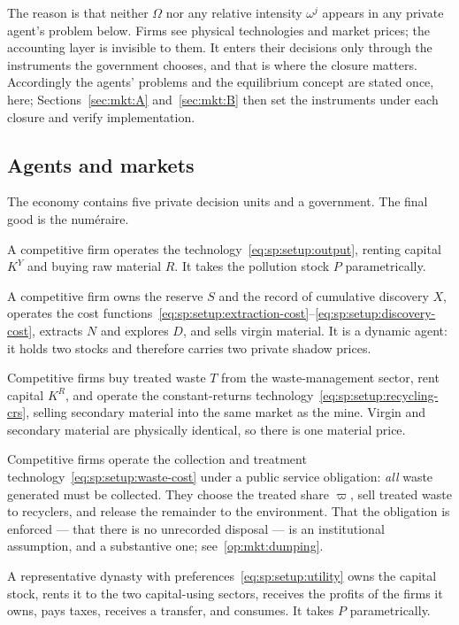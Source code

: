 The reason is that neither $\Omega$ nor any relative intensity $\omega^j$ appears in any private
agent's problem below. Firms see physical technologies and market prices; the accounting layer is
invisible to them. It enters their decisions only through the instruments the government chooses, and
that is where the closure matters. Accordingly the agents' problems and the equilibrium concept are
stated once, here; Sections~\ref{sec:mkt:A} and~\ref{sec:mkt:B} then set the instruments under each
closure and verify implementation.


\subsection{Agents and markets}\label{sec:mkt:setup:agents}

The economy contains five private decision units and a government. The final good is the numéraire.

 A competitive firm operates the technology~\eqref{eq:sp:setup:output},
renting capital $K^Y$ and buying raw material $R$. It takes the pollution stock $P$ parametrically.

 A competitive firm owns the reserve $S$ and the record of cumulative discovery
$X$, operates the cost functions~\eqref{eq:sp:setup:extraction-cost}--\eqref{eq:sp:setup:discovery-cost},
extracts $N$ and explores $D$, and sells virgin material. It is a dynamic agent: it holds two stocks
and therefore carries two private shadow prices.

 Competitive firms buy treated waste $T$ from the waste-management
sector, rent capital $K^R$, and operate the constant-returns
technology~\eqref{eq:sp:setup:recycling-crs}, selling secondary material into the same market as the
mine. Virgin and secondary material are physically identical, so there is one material price.

 Competitive firms operate the collection and treatment
technology~\eqref{eq:sp:setup:waste-cost} under a public service obligation: \emph{all} waste generated
must be collected. They choose the treated share $\varpi$, sell treated waste to recyclers, and release
the remainder to the environment. That the obligation is enforced --- that there is no unrecorded
disposal --- is an institutional assumption, and a substantive one; see~\ref{op:mkt:dumping}.

 A representative dynasty with preferences~\eqref{eq:sp:setup:utility} owns
the capital stock, rents it to the two capital-using sectors, receives the profits of the firms it
owns, pays taxes, receives a transfer, and consumes. It takes $P$ parametrically.

